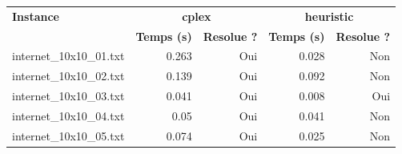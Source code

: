 \documentclass{article}
\begin{document}
\begin{center}
\renewcommand{\arraystretch}{1.3}
\begin{tabular}{lrrrr}
\hline
\textbf{Instance} & \multicolumn{2}{c}{\textbf{cplex}} & \multicolumn{2}{c}{\textbf{heuristic}}\\
 & \textbf{Temps (s)} & \textbf{Resolue ?} & \textbf{Temps (s)} & \textbf{Resolue ?}\\ \hline
internet\_10x10\_01.txt & 0.263 & Oui & 0.028 & Non\\
internet\_10x10\_02.txt & 0.139 & Oui & 0.092 & Non\\
internet\_10x10\_03.txt & 0.041 & Oui & 0.008 & Oui\\
internet\_10x10\_04.txt & 0.05 & Oui & 0.041 & Non\\
internet\_10x10\_05.txt & 0.074 & Oui & 0.025 & Non\\
\hline
\end{tabular}
\end{center}
\end{document}
